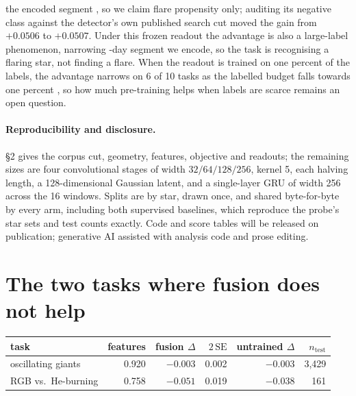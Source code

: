 \documentclass{article}
\providecommand{\DIFaddtex}[1]{{\protect\color{blue} \sf #1}} %
\providecommand{\DIFdeltex}[1]{{\protect\color{red} \scriptsize #1}} %
\providecommand{\DIFaddbegin}{} %
\providecommand{\DIFaddend}{} %
\providecommand{\DIFdelbegin}{} %
\providecommand{\DIFdelend}{} %
\providecommand{\DIFadd}[1]{\texorpdfstring{\DIFaddtex{#1}}{#1}} %
\providecommand{\DIFdel}[1]{\texorpdfstring{\DIFdeltex{#1}}{}} %
\providecommand{\DIFscaledelfig}{0.5}
\newlength{\DIFdelgraphicswidth} %
\newlength{\DIFdelgraphicsheight} %
\providecommand{\DIFaddincludegraphics}[2][]{{\color{blue}\fbox{\DIFOincludegraphics[#1]{#2}}}} %
\providecommand{\DIFdelincludegraphics}[2][]{%
\sbox{\DIFdelgraphicsbox}{\DIFOincludegraphics[#1]{#2}}%
\settoboxwidth{\DIFdelgraphicswidth}{\DIFdelgraphicsbox} %
\settoboxtotalheight{\DIFdelgraphicsheight}{\DIFdelgraphicsbox} %
\scalebox{\DIFscaledelfig}{%
\parbox[b]{\DIFdelgraphicswidth}{\usebox{\DIFdelgraphicsbox}\\[-\baselineskip] \rule{\DIFdelgraphicswidth}{0em}}\llap{\resizebox{\DIFdelgraphicswidth}{\DIFdelgraphicsheight}{%
\setlength{\unitlength}{\DIFdelgraphicswidth}%
\begin{picture}(1,1)%
\thicklines\linethickness{2pt} %
{\color[rgb]{1,0,0}\put(0,0){\framebox(1,1){}}}%
{\color[rgb]{1,0,0}\put(0,0){\line( 1,1){1}}}%
{\color[rgb]{1,0,0}\put(0,1){\line(1,-1){1}}}%
\end{picture}%
}\hspace*{3pt}}} %
} %
\DeclareRobustCommand{\DIFaddbegin}{\DIFOaddbegin \let\includegraphics\DIFaddincludegraphics} %
\DeclareRobustCommand{\DIFaddend}{\DIFOaddend \let\includegraphics\DIFOincludegraphics} %
\DeclareRobustCommand{\DIFdelbegin}{\DIFOdelbegin \let\includegraphics\DIFdelincludegraphics} %
\DeclareRobustCommand{\DIFdelend}{\DIFOaddend \let\includegraphics\DIFOincludegraphics} %
\begin{document}
the \DIFdelbegin \DIFdel{encoded segment , so we claim
flare propensity only; auditing its negative class against the detector's own published search cut
moved the gain from $+0.0506$ to $+0.0507$. Under this frozen readout the advantage is also a
large-label phenomenon, narrowing }\DIFdelend \DIFaddbegin \DIFadd{5.7-day segment we encode, so the task is recognising a flaring star, not finding a flare. When
the readout is trained on one percent of the labels, the advantage narrows }\DIFaddend on 6 of 10 tasks\DIFdelbegin \DIFdel{as the labelled budget falls towards one percent}\DIFdelend \DIFaddbegin \DIFadd{, so how
much pre-training helps when labels are scarce remains an open question}\DIFaddend .

\paragraph{Reproducibility and disclosure.} \S2 gives the corpus cut, geometry, features, objective
and readouts; the remaining sizes are four convolutional stages of width $32/64/128/256$, kernel 5,
each halving length, a 128-dimensional Gaussian latent, and a single-layer GRU of width 256 across the
16 windows. Splits are by star, drawn once, and shared byte-for-byte by every arm, including both
supervised baselines, which reproduce the probe's star sets and test counts exactly. Code and score tables
will be released on publication; generative AI assisted with analysis code and prose editing.




\appendix

\section{The two tasks where fusion does not help}
\label{app:negatives}

\begin{center}
\small
\begin{tabular}{lrrrrr}
\toprule
task & features & fusion $\Delta$ & $2\,\mathrm{SE}$ & untrained $\Delta$ & $n_{\mathrm{test}}$ \\
\midrule
oscillating giants & 0.920 & $-0.003$ & 0.002 & $-0.003$ & 3{,}429 \\
RGB vs.\ He-burning & 0.758 & $-0.051$ & 0.019 & $-0.038$ & 161 \\
\bottomrule
\end{tabular}
\end{center}
\end{document}
